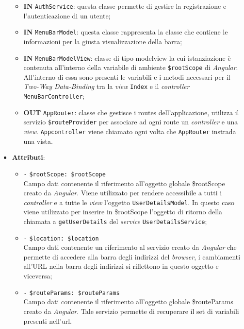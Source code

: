 \begin{itemize}
\begin{itemize}
		\item \textbf{IN} \texttt{AuthService}: questa classe permette di gestire la registrazione e l'autenticazione di un utente;
		\item \textbf{IN} \texttt{MenuBarModel}: questa classe rappresenta la classe che contiene le informazioni per la giusta visualizzazione della barra;
		\item \textbf{IN} \texttt{MenuBarModelView}: classe di tipo modelview la cui istanziazione è contenuta all'interno della variabile di ambiente \texttt{\$rootScope} di \textit{Angular}. All'interno di essa sono presenti le variabili e i metodi necessari per il \textit{Two-Way Data-Binding} tra la \textit{view} \texttt{Index} e il \textit{controller} \texttt{MenuBarController};
		\item \textbf{OUT} \texttt{AppRouter}: classe che gestisce i routes dell’applicazione, utilizza il servizio \texttt{\$routeProvider} per associare ad ogni route un \textit{controller} e una \textit{view}. \texttt{Appcontroller} viene chiamato ogni volta che \texttt{AppRouter} instrada una vista.
	\end{itemize}
	\item \textbf{Attributi}:
	\begin{itemize}
		\item \texttt{-} \texttt{\$rootScope: \$rootScope} \\
		Campo dati contenente il riferimento all'oggetto globale \$rootScope creato da \textit{Angular}. Viene utilizzato per rendere accessibile a tutti i \textit{controller} e a tutte le \textit{view} l'oggetto \texttt{UserDetailsModel}. In questo caso viene utilizzato per inserire in \$rootScope l'oggetto di ritorno della chiamata a \texttt{getUserDetails} del \textit{service} \texttt{UserDetailsService};
		\item \texttt{-} \texttt{\$location: \$location} \\
		Campo dati contenente un riferimento al servizio creato da \textit{Angular} che permette di accedere alla barra degli indirizzi del \textit{browser}, i cambiamenti all'URL nella barra degli indirizzi si riflettono in questo oggetto e viceversa; 
		\item \texttt{-} \texttt{\$routeParams: \$routeParams} \\
		Campo dati contenente il riferimento all'oggetto globale \$routeParams creato da \textit{Angular}. Tale servizio permette di recuperare il set di variabili presenti nell'url.

\end{itemize}
\end{itemize}
